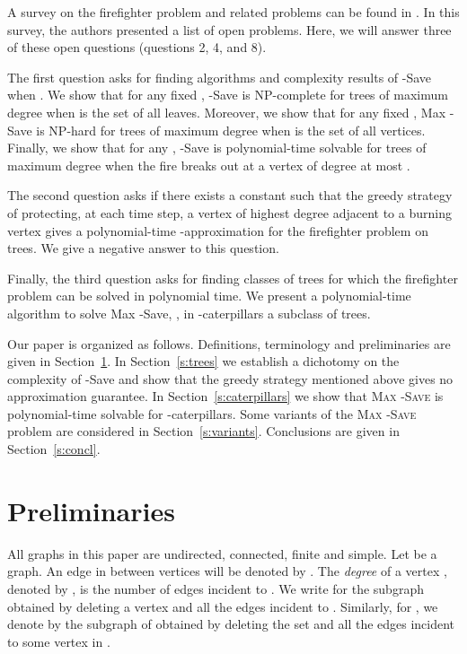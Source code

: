 \documentclass[10pt]{article}
\begin{document}
A survey on the firefighter problem and related problems can
be found in \cite{finbow2009}. In this survey, the authors presented a list of
open problems. Here, we will answer three of these open questions (questions 2, 4, and 8).

The first question asks for finding algorithms and complexity results of {\sc -Save}
when . We show that for any fixed , {\sc
-Save} is NP-complete for trees of maximum degree  when  is the set of all leaves. Moreover, we show that for any fixed ,
{\sc Max -Save} is NP-hard for trees of maximum degree  when  is the set of all vertices.
Finally, we show that for any , {\sc -Save} is polynomial-time solvable for trees of
maximum degree  when the fire breaks out at a vertex of degree at most .

The second question asks if there exists a constant  such that the greedy strategy of protecting, at each time step, a vertex of highest degree adjacent to a burning vertex gives a polynomial-time -approximation for the firefighter problem on trees. We give a negative answer to this question.

Finally, the third question asks for finding classes of trees for which the firefighter problem can be solved in
polynomial time. We present a polynomial-time algorithm to solve {\sc Max -Save}, , in -caterpillars a subclass of trees.



Our paper is organized as follows.
Definitions, terminology and preliminaries are given in  Section~\ref{s:prelim}.
In Section~\ref{s:trees} we establish a dichotomy on the complexity of {\sc -Save} and show that the greedy strategy mentioned above gives no approximation guarantee. In Section~\ref{s:caterpillars} we  show that \textsc{Max -Save} is polynomial-time solvable for
-caterpillars. Some variants of the \textsc{Max -Save} problem are considered in Section~\ref{s:variants}. Conclusions are given in Section~\ref{s:concl}.


\section{Preliminaries} \label{s:prelim}


All graphs in this paper are undirected, connected, finite and simple. Let  be a graph. An edge in  between vertices  will be denoted by . The \textit{degree} of a vertex , denoted by , is the number of edges incident to .
We write  for the subgraph obtained by deleting a vertex  and all the edges incident to . Similarly, for , we denote by  the subgraph of  obtained by deleting the set  and all the edges incident to some vertex in .
\end{document}
